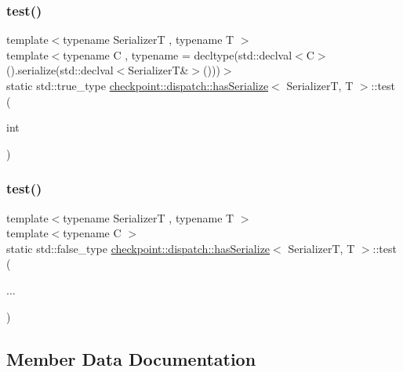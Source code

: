 \subsubsection{\texorpdfstring{test()}{test()}\hspace{0.1cm}{\footnotesize\ttfamily [1/2]}}
{\footnotesize\ttfamily template$<$typename SerializerT , typename T $>$ \\
template$<$typename C , typename  = decltype(std\+::declval$<$\+C$>$().\+serialize(std\+::declval$<$\+Serializer\+T\&$>$()))$>$ \\
static std\+::true\+\_\+type \hyperlink{structcheckpoint_1_1dispatch_1_1has_serialize}{checkpoint\+::dispatch\+::has\+Serialize}$<$ SerializerT, T $>$\+::test (\begin{DoxyParamCaption}\item[{int}]{ }\end{DoxyParamCaption})\hspace{0.3cm}{\ttfamily [static]}}

\mbox{\label{structcheckpoint_1_1dispatch_1_1has_serialize_ae7f501196169c72e131833398885f8db}} 
\subsubsection{\texorpdfstring{test()}{test()}\hspace{0.1cm}{\footnotesize\ttfamily [2/2]}}
{\footnotesize\ttfamily template$<$typename SerializerT , typename T $>$ \\
template$<$typename C $>$ \\
static std\+::false\+\_\+type \hyperlink{structcheckpoint_1_1dispatch_1_1has_serialize}{checkpoint\+::dispatch\+::has\+Serialize}$<$ SerializerT, T $>$\+::test (\begin{DoxyParamCaption}\item[{}]{... }\end{DoxyParamCaption})\hspace{0.3cm}{\ttfamily [static]}}



\subsection{Member Data Documentation}
\mbox{\label{structcheckpoint_1_1dispatch_1_1has_serialize_abebe1928949685ab9a4e3cab386968bc}} 
